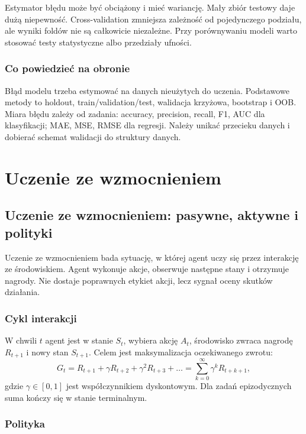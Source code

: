 Estymator błędu może być obciążony i mieć wariancję. Mały zbiór testowy daje dużą niepewność. Cross-validation zmniejsza zależność od pojedynczego podziału, ale wyniki foldów nie są całkowicie niezależne. Przy porównywaniu modeli warto stosować testy statystyczne albo przedziały ufności.

\subsubsection{Co powiedzieć na obronie}

Błąd modelu trzeba estymować na danych nieużytych do uczenia. Podstawowe metody to holdout, train/validation/test, walidacja krzyżowa, bootstrap i OOB. Miara błędu zależy od zadania: accuracy, precision, recall, F1, AUC dla klasyfikacji; MAE, MSE, RMSE dla regresji. Należy unikać przecieku danych i dobierać schemat walidacji do struktury danych.

\section{Uczenie ze wzmocnieniem}

\subsection{Uczenie ze wzmocnieniem: pasywne, aktywne i polityki}

Uczenie ze wzmocnieniem bada sytuację, w której agent uczy się przez interakcję ze środowiskiem. Agent wykonuje akcje, obserwuje następne stany i otrzymuje nagrody. Nie dostaje poprawnych etykiet akcji, lecz sygnał oceny skutków działania.

\subsubsection{Cykl interakcji}

W chwili $t$ agent jest w stanie $S_t$, wybiera akcję $A_t$, środowisko zwraca nagrodę $R_{t+1}$ i nowy stan $S_{t+1}$. Celem jest maksymalizacja oczekiwanego zwrotu:
\[
G_t=R_{t+1}+\gamma R_{t+2}+\gamma^2R_{t+3}+\dots
=\sum_{k=0}^{\infty}\gamma^k R_{t+k+1},
\]
gdzie $\gamma\in[0,1]$ jest współczynnikiem dyskontowym. Dla zadań epizodycznych suma kończy się w stanie terminalnym.

\subsubsection{Polityka}

